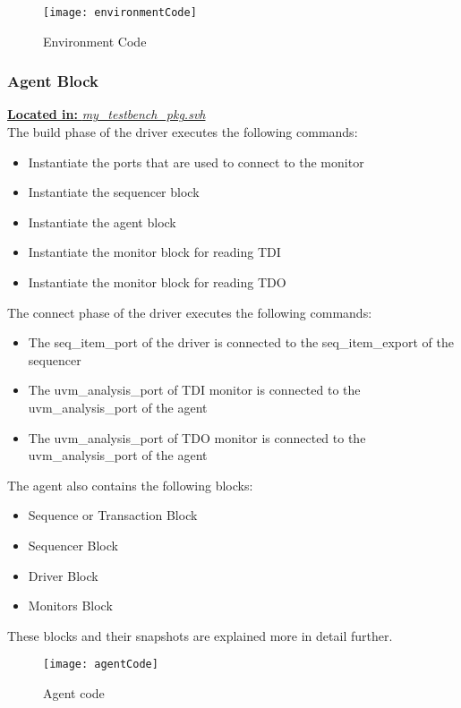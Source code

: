 \documentclass[a4paper,11pt]{article}
\begin{document}
\begin{figure}[ht]
\centering
\texttt{[image: environmentCode]}
\caption{Environment Code}
\end{figure}

\FloatBarrier
\subsubsection{Agent Block}

\underline{\textbf{Located in:} \textit{my\_testbench\_pkg.svh}}\\

The build phase of the driver executes the following commands:
\begin{itemize}[noitemsep]
\item Instantiate the ports that are used to connect to the monitor
\item Instantiate the sequencer block
\item Instantiate the agent block
\item Instantiate the monitor block for reading TDI 
\item Instantiate the monitor block for reading TDO
\end{itemize}

The connect phase of the driver executes the following commands:
\begin{itemize}[noitemsep]
\item The seq\_item\_port of the driver is connected to the seq\_item\_export of the sequencer
\item The uvm\_analysis\_port of TDI monitor is connected to the uvm\_analysis\_port of the agent
\item The uvm\_analysis\_port of TDO monitor is connected to the uvm\_analysis\_port of the agent
\end{itemize}

The agent also contains the following blocks:
\begin{itemize}[noitemsep]
\item Sequence or Transaction Block
\item Sequencer Block
\item Driver Block
\item Monitors Block
\end{itemize}
These blocks and their snapshots are explained more in detail further.

\begin{figure}[ht]
\centering
\texttt{[image: agentCode]}
\caption{Agent code}
\end{figure}
\end{document}
